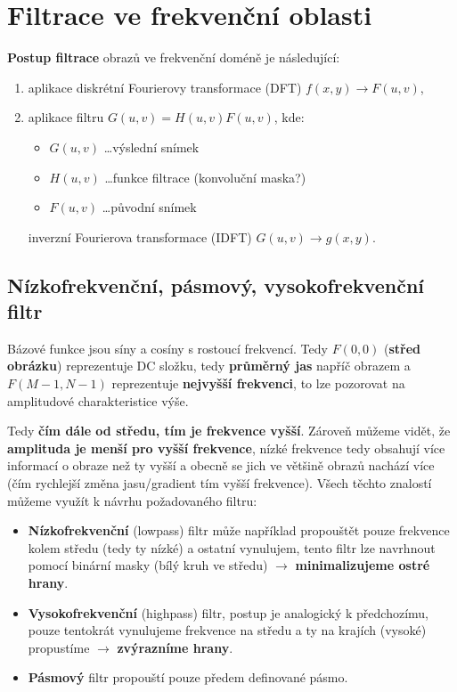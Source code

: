 \section{Filtrace ve frekvenční oblasti}
\textbf{Postup filtrace} obrazů ve frekvenční doméně je následující:
\begin{enumerate}
    \item aplikace diskrétní Fourierovy transformace (DFT) $f(x, y) \rightarrow F(u, v)$,
    \item aplikace filtru $G(u, v) = H(u, v) F(u, v)$, kde:
          \begin{itemize}
              \item $G(u, v)$ \ldots výslední snímek
              \item $H(u, v)$ \ldots funkce filtrace (konvoluční maska?)
              \item $F(u, v)$ \ldots původní snímek
          \end{itemize}
          inverzní Fourierova transformace (IDFT) $G(u, v) \rightarrow g(x, y)$.
\end{enumerate}

\subsection{Nízkofrekvenční, pásmový, vysokofrekvenční filtr}
Bázové funkce jsou síny a cosíny s rostoucí frekvencí. Tedy $ F(0, 0) $ (\textbf{střed obrázku}) reprezentuje DC složku, tedy \textbf{průměrný jas} napříč obrazem a $F(M -1, N - 1)$ reprezentuje \textbf{nejvyšší frekvenci}, to lze pozorovat na amplitudové charakteristice výše.

Tedy \textbf{čím dále od středu, tím je frekvence vyšší}. Zároveň můžeme vidět, že \textbf{amplituda je menší pro vyšší frekvence}, nízké frekvence tedy obsahují více informací o obraze než ty vyšší a obecně se jich ve většině obrazů nachází více (čím rychlejší změna jasu/gradient tím vyšší frekvence). Všech těchto znalostí můžeme využít k návrhu požadovaného filtru:
\begin{itemize}
    \item \textbf{Nízkofrekvenční} (lowpass) filtr může například propouštět pouze frekvence kolem středu (tedy ty nízké) a ostatní vynulujem, tento filtr lze navrhnout pomocí binární masky (bílý kruh ve středu) $\rightarrow$ \textbf{minimalizujeme ostré hrany}.
    \item \textbf{Vysokofrekvenční} (highpass) filtr, postup je analogický k předchozímu, pouze tentokrát vynulujeme frekvence na středu a ty na krajích (vysoké) propustíme $\rightarrow$ \textbf{zvýrazníme hrany}.
    \item \textbf{Pásmový} filtr propouští pouze předem definované pásmo.
\end{itemize}

